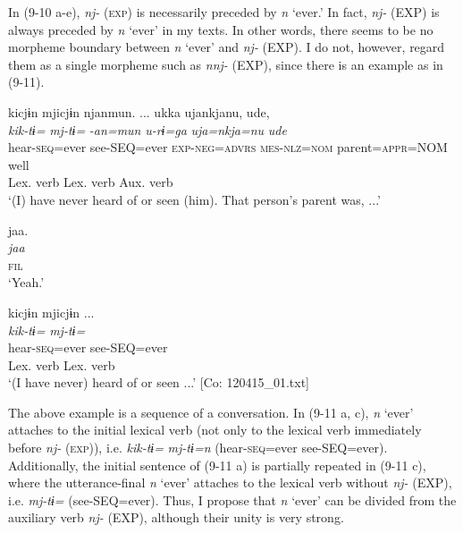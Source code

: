 In (9-10 a-e), \textit{nj-} (\textsc{exp}) is necessarily preceded by \textit{n} ‘ever.’ In fact, \textit{nj-} (EXP) is always preceded by \textit{n} ‘ever’ in my texts. In other words, there seems to be no morpheme boundary between \textit{n} ‘ever’ and \textit{nj-} (EXP). I do not, however, regard them as a single morpheme such as \textit{nnj-} (EXP), since there is an example as in (9-11).

\ea    \label{ex:9.11}
\ea\label{ex:9.11a} %
     \gllll kicjɨn  mjicjɨn  njanmun.  ...  ukka  ujankjanu,  ude,\\
      \textit{kik-tɨ=}  \textit{mj-tɨ=}  \textit{-an=mun}    \textit{u-rɨ=ga}    \textit{uja=nkja=nu}  \textit{ude}\\
      hear-\textsc{seq}=ever  see-SEQ=ever  \textsc{exp}-\textsc{neg}=\textsc{advrs}    \textsc{mes}-\textsc{nlz}=\textsc{nom}  parent=\textsc{appr}=NOM  well\\
      {Lex. verb}  {Lex. verb}  {Aux. verb}\\
    \glt      ‘(I) have never heard of or seen (him). That person’s parent was, ...’

\ex\label{ex:9.11b} %
      \glll jaa.\\
      \textit{jaa}\\
      \textsc{fil}\\
    \glt  ‘Yeah.’  

\ex \label{ex:9.11c} %
     \gllll     kicjɨn  mjicjɨn  ...  \\
      \textit{kik-tɨ=}  \textit{mj-tɨ=}    \\
      hear-\textsc{seq}=ever  see-SEQ=ever    \\
      {Lex. verb}  {Lex. verb}    \\
      \glt       ‘(I have never) heard of or seen ...’   [Co: 120415\_01.txt]
    \z
\z

The above example is a sequence of a conversation. In (9-11 a, c), \textit{n} ‘ever’ attaches to the initial lexical verb (not only to the lexical verb immediately before \textit{nj-} (\textsc{exp})), i.e. \textit{kik-tɨ=} \textit{mj-tɨ=n} (hear-\textsc{seq}=ever see-SEQ=ever). Additionally, the initial sentence of (9-11 a) is partially repeated in (9-11 c), where the utterance-final \textit{n} ‘ever’ attaches to the lexical verb without \textit{nj-} (EXP), i.e. \textit{mj-tɨ=} (see-SEQ=ever). Thus, I propose that \textit{n} ‘ever’ can be divided from the auxiliary verb \textit{nj-} (EXP), although their unity is very strong.

